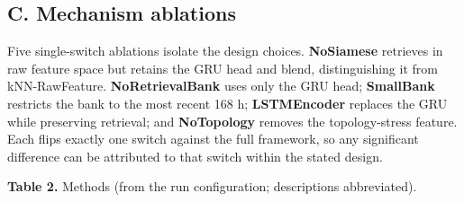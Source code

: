 \documentclass[
  10pt,
  a4paper,
]{article}
\begin{document}
\subsection{C. Mechanism ablations}\label{c.-mechanism-ablations}

Five single-switch ablations isolate the design choices.
\textbf{NoSiamese} retrieves in raw feature space but retains the GRU
head and blend, distinguishing it from kNN-RawFeature.
\textbf{NoRetrievalBank} uses only the GRU head; \textbf{SmallBank}
restricts the bank to the most recent 168 h; \textbf{LSTMEncoder}
replaces the GRU while preserving retrieval; and \textbf{NoTopology}
removes the topology-stress feature. Each flips exactly one switch
against the full framework, so any significant difference can be
attributed to that switch within the stated design.

\textbf{Table 2.} Methods (from the run configuration; descriptions
abbreviated).
\end{document}
